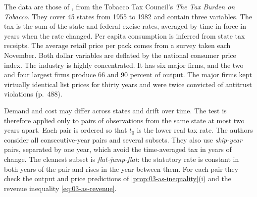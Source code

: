  The data are those of \citet{Sullivan1985}, from the Tobacco Tax Council's \emph{The Tax
Burden on Tobacco}. They cover 45 states from 1955 to 1982 and contain three variables. The tax is the sum of
the state and federal excise rates, averaged by time in force in years when the rate changed. Per capita
consumption is inferred from state tax receipts. The average retail price per pack comes from a survey taken
each November. Both dollar variables are deflated by the national consumer price index. The industry is
highly concentrated. It has six major firms, and the two and four largest firms produce 66 and 90 percent of
output. The major firms kept virtually identical list prices for thirty years and were twice convicted of
antitrust violations (p.~488).

 Demand and cost may differ across states and drift over time. The test is therefore applied
only to pairs of observations from the same state at most two years apart. Each pair is ordered so that
$t_0$ is the lower real tax rate. The authors consider all consecutive-year pairs and several subsets. They
also use \emph{skip-year} pairs, separated by one year, which avoid the time-averaged tax in years of
change. The cleanest subset is \emph{flat-jump-flat}: the statutory rate is constant in both years of the
pair and rises in the year between them. For each pair they check the output and price predictions of
\cref{prop:03-as-inequality}(i) and the revenue inequality \eqref{eq:03-as-revenue}.


